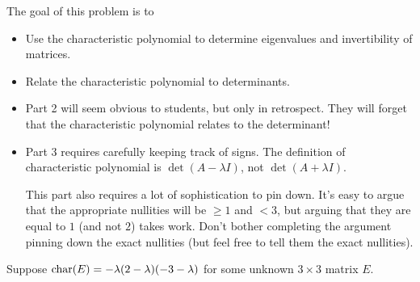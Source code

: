 \documentclass{problemset}
\newcommand{\bookonlynewpage}{\begin{bookonly}\newpage\end{bookonly}}
\begin{document}
	\bookonlynewpage
	\question
	\begin{annotation}
		\begin{goals}

			The goal of this problem is to
			\begin{itemize}
				\item Use the characteristic polynomial to determine eigenvalues
					and invertibility of matrices.
				\item Relate the characteristic polynomial to determinants.
			\end{itemize}
		\end{goals}

		\begin{notes}
			\begin{itemize}
				\item Part 2 will seem obvious to students, but only
					in retrospect. They will forget that the characteristic polynomial
					relates to the determinant!
				\item Part 3 requires carefully keeping track of signs. The definition of characteristic
					polynomial is $\det(A-\lambda I)$, not $\det(A+\lambda I)$.

					This part also requires a lot of sophistication to pin down.
					It's easy to argue that the appropriate nullities will be $\geq 1$
					and $<3$, but arguing that they are equal to $1$ (and not $2$) takes work.
					Don't bother completing the argument pinning down the exact nullities 
					(but feel free to tell them the exact nullities).
			\end{itemize}
		\end{notes}
	\end{annotation}
	\vspace{-.2cm}
	Suppose $\operatorname{char}(E)=-\lambda(2-\lambda)(-3-\lambda)$ for some unknown $3\times 3$
	matrix $E$.
\end{document}
